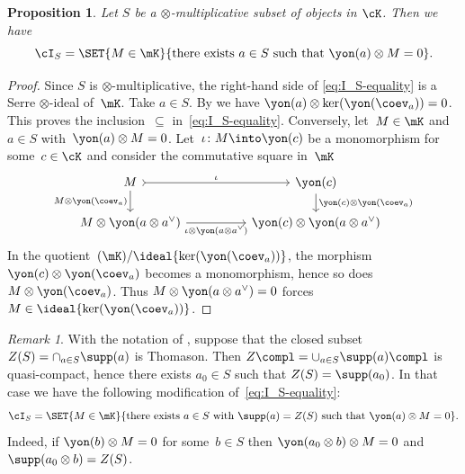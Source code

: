 \documentclass[11pt]{amsart}
\numberwithin{equation}{section} %
\theoremstyle{plain}
\newtheorem{prop}[equation]{Proposition}
\theoremstyle{definition}
\theoremstyle{remark}
\newtheorem{rem}[equation]{Remark}
\begin{document}
\begin{prop}
\label{prop:I_S}%
Let $S$ be a $\otimes$-multiplicative subset of objects in $\cK$. Then we have 
\begin{equation}
\label{eq:I_S-equality}
\cI_{S} = \SET{M \in \mK}{\textrm{there exists } a \in S\textrm{ such that }\yon(a) \otimes M = 0}.
\end{equation}
\end{prop}
\begin{proof}
Since $S$ is $\otimes$-multiplicative, the right-hand side of \eqref{eq:I_S-equality} is a Serre $\otimes$-ideal of~$\mK$. Take $a\in S$. By  we have $\yon(a) \otimes \ker(\yon(\coev_a))=0$. This proves the inclusion~$\subseteq$ in~\eqref{eq:I_S-equality}.
Conversely, let~$M \in \mK$ and $a \in S$ with~$\yon(a) \otimes M =0$. Let~$\iota\colon M \into \yon(c)$ be a monomorphism for some~$c \in \cK$ and consider the commutative square in~$\mK$
\[\begin{tikzcd}[row sep=1.5em]
	M && {\yon(c)} \\
	{M \otimes \yon(a \otimes a^{\vee})} && {\yon(c) \otimes \yon(a \otimes a^{\vee})}
	\arrow["\iota", tail, from=1-1, to=1-3]
	\arrow["{M \otimes \yon(\coev_a)}"', from=1-1, to=2-1]
	\arrow["{\yon(c) \otimes \yon(\coev_a)}", from=1-3, to=2-3]
	\arrow["{\iota \otimes \yon(a \otimes a^{\vee})}"', from=2-1, to=2-3]
\end{tikzcd}
\]
%
In the quotient~$(\mK)/\ideal{\ker(\yon(\coev_a))} $, the morphism $\yon(c) \otimes \yon(\coev_a)$ becomes a monomorphism, hence so does $M \otimes \yon(\coev_a)$. Thus $M \otimes \yon(a \otimes a^{\vee}) = 0$ forces $M \in \ideal{\ker(\yon(\coev_a))} $.
\end{proof}

%
\begin{rem}
\label{rem:I_S-Thomason}%
With the notation of , suppose that the closed subset $Z(S)=\cap_{a\in S}\supp(a)$ is Thomason. Then $Z\compl=\cup_{a\in S}\supp(a)\compl$ is quasi-compact, hence there exists $a_0\in S$ such that $Z(S)=\supp(a_0)$.
In that case we have the following modification of~\eqref{eq:I_S-equality}:
\begin{equation*}
\label{eq:I_S-newequality}
\cI_{S} = \SET{M \in \mK}{\textrm{there exists } a \in S\textrm{ with } \supp(a) = Z(S) \textrm{ such that }\yon(a) \otimes M = 0}.
\end{equation*}
Indeed, if $\yon(b)\otimes M=0$ for some~$b\in S$ then $\yon(a_0\otimes b)\otimes M=0$ and $\supp(a_0\otimes b)=Z(S)$.
\end{rem}
\end{document}
